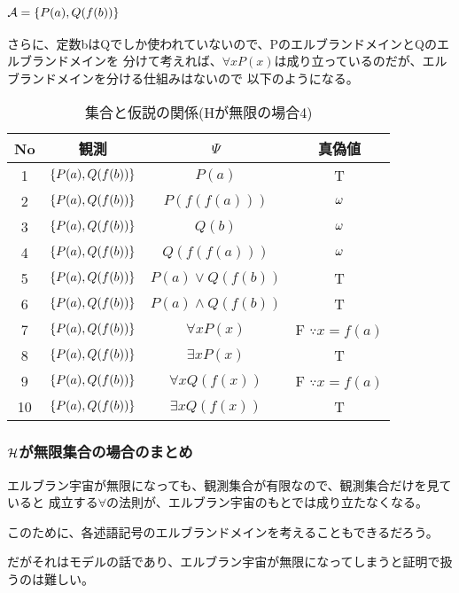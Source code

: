 \documentclass[10pt, oneside]{jarticle}   	%
\begin{document}
\subsubsection{$\mathcal{A}=\{{P(a), Q(f(b))}\}$}
さらに、定数bはQでしか使われていないので、PのエルブランドメインとQのエルブランドメインを
分けて考えれば、$\forall x P(x)$は成り立っているのだが、エルブランドメインを分ける仕組みはないので
以下のようになる。

\begin{table}[htbp]
 \centering
 \begin{tabular}{|c|c|c|c|}\hline
   No & 観測 & $\Psi$ & 真偽値 \\ \hline
   1 & $\{{P(a), Q(f(b))}\}$ & $P(a)$ & T \\ \hline
   2 & $\{{P(a), Q(f(b))}\}$ & $P(f(f(a)))$ & $\omega$ \\ \hline
   3 & $\{{P(a), Q(f(b))}\}$ & $Q(b)$ & $\omega$ \\ \hline
   4 & $\{{P(a), Q(f(b))}\}$ & $Q(f(f(a)))$ & $\omega$ \\ \hline
   
   5 & $\{{P(a), Q(f(b))}\}$ & $P(a) \lor Q(f(b))$ & T \\ \hline
   6 & $\{{P(a), Q(f(b))}\}$ & $P(a) \land Q(f(b))$ & T\\ \hline
   
   7 & $\{{P(a), Q(f(b))}\}$ & $\forall x P(x)$ & F $\because x=f(a)$ \\ \hline
   8 & $\{{P(a), Q(f(b))}\}$ & $\exists x P(x)$ & T \\ \hline
   9 & $\{{P(a), Q(f(b))}\}$ & $\forall x Q(f(x))$ & F $\because x=f(a)$\\ \hline
   10 & $\{{P(a), Q(f(b))}\}$ & $\exists x Q(f(x))$ & T \\ \hline
 \end{tabular}
 \caption{集合と仮説の関係(Hが無限の場合4)}
 \label{tab:ex0204}
\end{table}

\subsubsection{$\mathcal{H}$が無限集合の場合のまとめ}
エルブラン宇宙が無限になっても、観測集合が有限なので、観測集合だけを見ていると
成立する$\forall$の法則が、エルブラン宇宙のもとでは成り立たなくなる。

このために、各述語記号のエルブランドメインを考えることもできるだろう。

だがそれはモデルの話であり、エルブラン宇宙が無限になってしまうと証明で扱うのは難しい。
\end{document}
